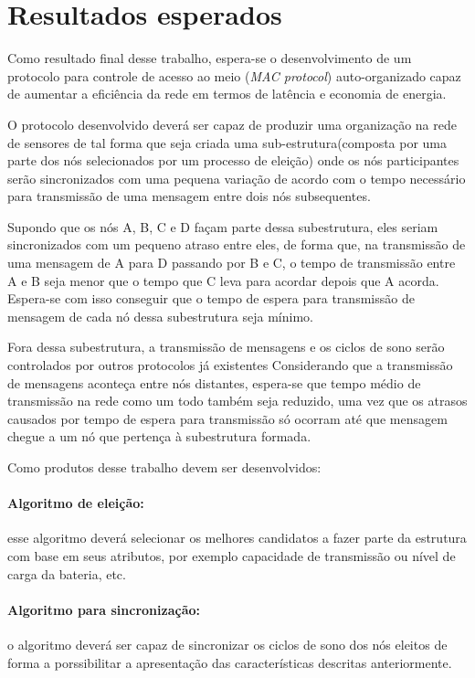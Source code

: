 \chapter{Resultados esperados}

Como resultado final desse trabalho, espera-se o desenvolvimento de um protocolo para controle de acesso ao meio (\textit{MAC protocol}) auto-organizado capaz de aumentar a eficiência da rede em termos de latência e economia de energia. 

O protocolo desenvolvido deverá ser capaz de produzir uma organização na rede de sensores de tal forma que seja criada uma sub-estrutura(composta por uma parte dos nós selecionados por um processo de eleição) onde os nós participantes serão sincronizados com uma pequena variação de acordo com o tempo necessário para transmissão de uma mensagem entre dois nós subsequentes. 

Supondo que os nós A, B, C e D façam parte dessa subestrutura, eles seriam sincronizados com um pequeno atraso entre eles, de forma que, na transmissão de uma mensagem de A para D passando por B e C, o tempo de transmissão entre A e B seja menor que o tempo que C leva para acordar depois que A acorda. Espera-se com isso conseguir que o tempo de espera para transmissão de mensagem de cada nó dessa subestrutura seja mínimo. 

Fora dessa subestrutura, a transmissão de mensagens e os ciclos de sono serão controlados por outros protocolos já existentes Considerando que a transmissão de mensagens aconteça entre nós distantes, espera-se que tempo médio de transmissão na rede como um todo também seja reduzido, uma vez que os atrasos causados por tempo de espera para transmissão só ocorram até que mensagem chegue a um nó que pertença à subestrutura formada. 

Como produtos desse trabalho devem ser desenvolvidos:
 
 \subsubsection{Algoritmo de eleição:} esse algoritmo deverá selecionar os melhores candidatos a fazer parte da estrutura com base em seus atributos, por exemplo capacidade de transmissão ou nível de carga da bateria, etc.
 
 \subsubsection{Algoritmo para sincronização:} o algoritmo deverá ser capaz de sincronizar os ciclos de sono dos nós eleitos de forma a porssibilitar a apresentação das características descritas anteriormente.
 
